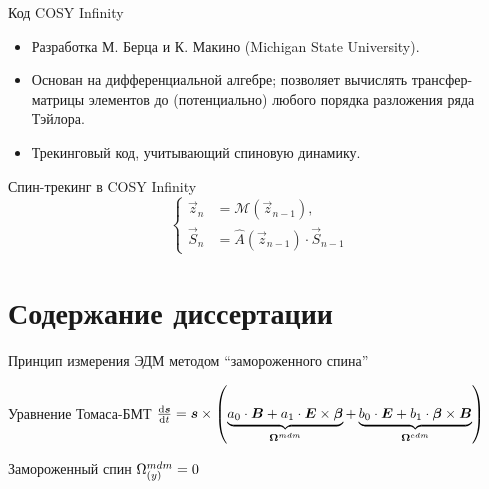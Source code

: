 \documentclass[14pt]{beamer}
\newcommand{\Wedm}{\W^{edm}}
\newcommand{\Wmdm}{\W^{mdm}}
\begin{document}
\begin{frame}{Код COSY Infinity}
	\begin{itemize}
		\item Разработка М. Берца и К. Макино (Michigan State University).
		\item Основан на дифференциальной алгебре; позволяет вычислять трансфер-матрицы элементов до (потенциально) любого порядка разложения ряда Тэйлора.
		\item Трекинговый код, учитывающий спиновую динамику.
	\end{itemize}
\end{frame}
\begin{frame}{Спин-трекинг в COSY Infinity} 
	\[
	\begin{cases}
	\vec{z}_n &= \mathcal{M}(\vec{z}_{n-1}), \\
	\vec{S}_n &= \hat A(\vec z_{n-1})\cdot \vec S_{n-1}
	\end{cases}
	\]
\end{frame}

\section{Содержание диссертации}
\begin{frame}{Принцип измерения ЭДМ методом ``замороженного спина''}
	\begin{block}{Уравнение Томаса-БМТ}
		$\frac{\rd \vec s}{\rd t} = \vec s \times \bkt{\underbrace{a_0\cdot\vec B + a_1\cdot\vec E\times\vec\beta}_{\vec\Wmdm} + \underbrace{b_0\cdot\vec E + b_1\cdot\vec\beta\times\vec B}_{\vec\Wedm}}$
	\end{block}
	\begin{block}{Замороженный спин}
		$\Wmdm_{(y)} = 0$
	\end{block}
\end{frame}
\end{document}
